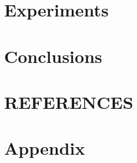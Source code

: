 \documentclass[sigconf, nonacm]{acmart}
\begin{document}
\section{Experiments}
\label{sec:experiments}


\section{Conclusions}
\label{sec:conclusions}


\section{REFERENCES}
\label{sec:references}





\newpage
\appendix
\section{Appendix}

\end{document}
